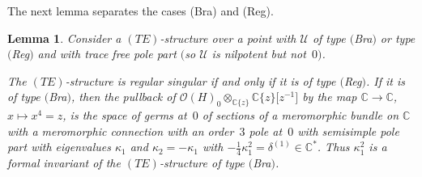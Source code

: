 \documentclass[10pt,a4paper]{amsart}
\numberwithin{equation}{section}
\numberwithin{figure}{section}
\newcommand{\C}{{\mathbb C}}
\newcommand{\OO}{{\mathcal O}}
\newcommand{\UU}{{\mathcal U}}
\newtheorem{Lemma}[Theorem]{Lemma}
\begin{document}
The next lemma separates the cases (Bra) and (Reg).

\begin{Lemma}\label{t4.9}
Consider a $(TE)$-structure over a point with
$\UU$ of type $($Bra$)$ or type $($Reg$)$ and with trace free pole part
$($so $\UU$ is nilpotent but not~$0)$.

The $(TE)$-structure is regular singular if and only
if it is of type $($Reg$)$. If it is of type $($Bra$)$,
then the pullback of
$\OO(H)_0\otimes_{\C\{z\}}\C\{z\}\big[z^{-1}\big]$
by the map $\C\to\C$, $x\mapsto x^4=z$,
is the space of germs at~$0$ of sections of a meromorphic bundle
on $\C$ with a meromorphic connection
with an order~$3$ pole at~$0$ with semisimple pole part with
eigenvalues $\kappa_1$ and $\kappa_2=-\kappa_1$ with
$-\frac{1}{4}\kappa_1^2=\delta^{(1)}\in\C^*$.
Thus $\kappa_1^2$ is a formal invariant of the
$(TE)$-structure of type $($Bra$)$.
\end{Lemma}
\end{document}
